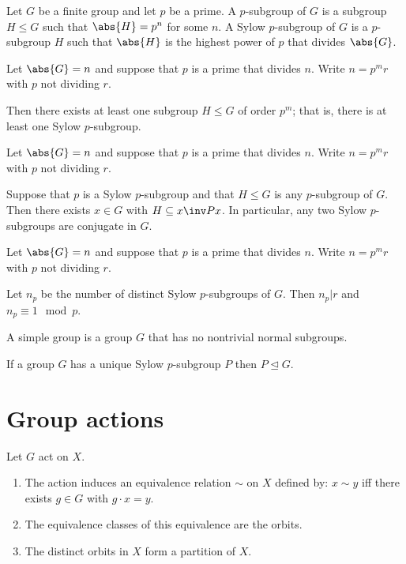 \documentclass{article}
\begin{document}
\begin{definition}
  \label{def:p-subgroup}
  Let $G$ be a finite group and let $p$ be a prime.
  A $p$-subgroup of $G$ is a subgroup $H\leq G$ such that $\abs{H}=p^n$ for some $n$.
  A Sylow $p$-subgroup of $G$ is a $p$-subgroup $H$ such that $\abs{H}$ is the highest
  power of $p$ that divides $\abs{G}$.
\end{definition}

\begin{theorem}[Sylow I]
  Let $\abs{G}=n$ and suppose that $p$ is a prime that divides $n$. Write $n=p^mr$ with
  $p$ not dividing $r$.

  Then there exists at least one subgroup $H\leq G$ of order $p^m$; that is, there is at
  least one Sylow $p$-subgroup.
\end{theorem}

\begin{theorem}[Sylow II]
  Let $\abs{G}=n$ and suppose that $p$ is a prime that divides $n$. Write $n=p^mr$ with
  $p$ not dividing $r$.

  Suppose that $p$ is a Sylow $p$-subgroup and that $H\leq G$ is any $p$-subgroup of $G$.
  Then there exists $x\in G$ with $H\subseteq x\inv Px$. In particular, any two Sylow
  $p$-subgroups are conjugate in $G$.
\end{theorem}

\begin{theorem}
  Let $\abs{G}=n$ and suppose that $p$ is a prime that divides $n$. Write $n=p^mr$ with
  $p$ not dividing $r$.

  Let $n_p$ be the number of distinct Sylow $p$-subgroups of $G$. Then $n_p\vert r$ and
  $n_p\equiv 1\mod p$.
\end{theorem}

\begin{definition} \label{def:simple-group}
  A simple group is a group $G$ that has no nontrivial normal subgroups.
\end{definition}

\begin{lemma}
  If a group $G$ has a unique Sylow $p$-subgroup $P$ then $P\trianglelefteq G$.
\end{lemma}

\section{Group actions}
\label{sec:group-actions}

\begin{lemma}
  Let $G$ act on $X$.
  \begin{enumerate}
    \item The action induces an equivalence relation $\sim$ on $X$ defined by: $x\sim y$ iff
      there exists $g\in G$ with $g\cdot x= y$.
    \item The equivalence classes of this equivalence are the orbits.
    \item The distinct orbits in $X$ form a partition of $X$.
  \end{enumerate}
\end{lemma}
\end{document}
